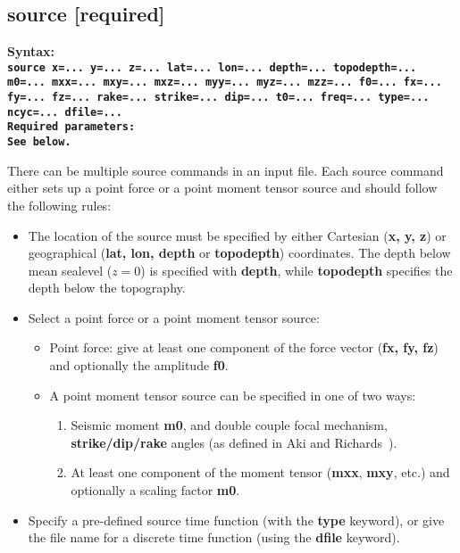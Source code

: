 \documentclass[11pt]{report}
\begin{document}
\subsection{source [required]}
\label{keyword:source}
\begin{flushleft}
\bf
Syntax:\\ \tt source
x=... y=... z=... lat=... lon=... depth=... topodepth=... m0=... mxx=... mxy=... mxz=...
myy=... myz=... mzz=... f0=... fx=... fy=... fz=... rake=... strike=... dip=... t0=... 
freq=... type=... ncyc=... dfile=...\\ 
\bf
Required parameters:\\ \rm See below.
\end{flushleft}
There can be multiple source commands in an input file. Each source command either sets up a point
force or a point moment tensor source and should follow the following rules:
\begin{itemize}
\item The location of the source must be specified by either Cartesian ({\bf x, y, z}) or
  geographical ({\bf lat, lon, depth} or {\bf topodepth}) coordinates. The depth below mean sealevel
  ($z=0$) is specified with {\bf depth}, while {\bf topodepth} specifies the depth below the
  topography.
\item Select a point force or a point moment tensor source:
  \begin{itemize}	
  \item Point force: give at least one component of the force vector ({\bf fx, fy, fz}) and
    optionally the amplitude {\bf f0}.
  \item A point moment tensor source can be specified in one of two ways:
    \begin{enumerate}
    \item Seismic moment {\bf m0}, and double couple focal mechanism, {\bf strike/dip/rake} angles
      (as defined in Aki and Richards~\cite{Aki-Richards-02}). 
    \item At least one component of the moment tensor ({\bf mxx}, {\bf mxy}, etc.) and optionally a
      scaling factor {\bf m0}. 
    \end{enumerate}
  \end{itemize}
\item Specify a pre-defined source time function (with the {\bf type} keyword), or give the file
  name for a discrete time function (using the {\bf dfile} keyword).
\end{itemize}
\end{document}
